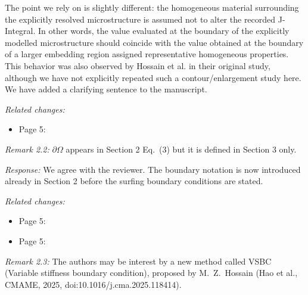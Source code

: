 \documentclass[pdflatex,sn-mathphys-num]{sn-jnl}
\begin{document}
The point we rely on is slightly different: the homogeneous material surrounding the explicitly resolved microstructure is assumed not to alter the recorded J-Integral. In other words, the value evaluated at the boundary of the explicitly modelled microstructure should coincide with the value obtained at the boundary of a larger embedding region assigned representative homogeneous properties. This behavior was also observed by Hossain et al. in their original study, although we have not explicitly repeated such a contour/enlargement study here. We have added a clarifying sentence to the manuscript.

\emph{Related changes:}
\begin{itemize}
\item Page 5: 
\end{itemize}

\emph{Remark 2.2:} $\partial\Omega$ appears in Section 2 Eq.~(3) but it is defined in Section 3 only.

\emph{Response:} We agree with the reviewer. The boundary notation is now introduced already in Section 2 before the surfing boundary conditions are stated.

\emph{Related changes:}
\begin{itemize}
\item Page 5: 
\item Page 5: 
\end{itemize}

\emph{Remark 2.3:} The authors may be interest by a new method called VSBC (Variable stiffness boundary condition), proposed by M.~Z.~Hossain (Hao et al., CMAME, 2025, doi:10.1016/j.cma.2025.118414).
\end{document}
